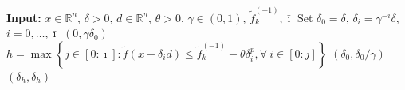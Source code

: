 \documentclass[11pt,a4paper]{article}
\newcommand{\f}{\tilde{f}}
\newcommand{\Imax}{\bar{\imath}}%
\newcommand{\Dexp}{p}
\begin{document}





\begin{algorithm}[H]
\caption{StochasticLinesearch}
\label{alg:lsep}
\begin{algorithmic}[1]
\State \textbf{Input:} $x \in \mathbb{R}^n$, $\delta > 0$, $d \in \mathbb{R}^n$, $\theta > 0$, $\gamma \in (0,1)$, $\f_k^{(-1)}, \Imax$
        \State Set $\delta_0 = \delta$, $\delta_i=\gamma^{-i}\delta$, \quad $i=0,\ldots,\Imax$
    \State \Return $(0,\gamma\delta_0)$
\EndIf
\State $h=\max\left\{j\in[0:\Imax]:
\tilde f(x+\delta_i d)\le \tilde f_k^{(-1)}-\theta\delta_i^p, \forall\ i\in[0:j] \right\}$
    \State \Return $(\delta_0,\delta_0/\gamma)$
\Else
    \State \Return $(\delta_h,\delta_h)$
\EndIf
\end{algorithmic}
\end{algorithm}
\end{document}
